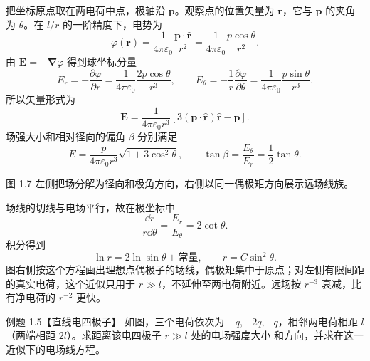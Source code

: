 \begin{xesolution}
把坐标原点取在两电荷中点，极轴沿 $\boldsymbol p$。观察点的位置矢量为 $\boldsymbol r$，它与
$\boldsymbol p$ 的夹角为 $\theta$。在 $l/r$ 的一阶精度下，电势为
\[
  \varphi(\boldsymbol r)
  =\frac{1}{4\pi\varepsilon_0}\frac{\boldsymbol p\cdot\hat{\boldsymbol r}}{r^2}
  =\frac{1}{4\pi\varepsilon_0}\frac{p\cos\theta}{r^2}.
\]
由 $\boldsymbol E=-\boldsymbol\nabla\varphi$ 得到球坐标分量
\[
  E_r=-\frac{\partial\varphi}{\partial r}
  =\frac{1}{4\pi\varepsilon_0}\frac{2p\cos\theta}{r^3},
  \qquad
  E_\theta=-\frac1r\frac{\partial\varphi}{\partial\theta}
  =\frac{1}{4\pi\varepsilon_0}\frac{p\sin\theta}{r^3}.
\]
所以矢量形式为
\[
  \boxed{\boldsymbol E
  =\frac{1}{4\pi\varepsilon_0r^3}
  \left[3(\boldsymbol p\cdot\hat{\boldsymbol r})\hat{\boldsymbol r}-\boldsymbol p\right]}.
\]
场强大小和相对径向的偏角 $\beta$ 分别满足
\[
  \boxed{E=\frac{p}{4\pi\varepsilon_0r^3}\sqrt{1+3\cos^2\theta}},
  \qquad
  \tan\beta=\frac{E_\theta}{E_r}=\frac12\tan\theta.
\]

图 1.7 左侧把场分解为径向和极角方向，右侧以同一偶极矩方向展示远场线族。

\dipoleFarFigure
{}

场线的切线与电场平行，故在极坐标中
\[
  \frac{\dd r}{r\dd\theta}=\frac{E_r}{E_\theta}=2\cot\theta.
\]
积分得到
\[
  \ln r=2\ln\sin\theta+\text{常量},
  \qquad
  \boxed{r=C\sin^2\theta}.
\]
图右侧按这个方程画出理想点偶极子的场线，偶极矩集中于原点；对左侧有限间距的真实电荷，这个近似只用于 $r\gg l$，不延伸至两电荷附近。远场按 $r^{-3}$ 衰减，比有净电荷的
$r^{-2}$ 更快。
\end{xesolution}

\begin{origexamplebox}{例题 1.5【直线电四极子】}
如图，三个电荷依次为 $-q,+2q,-q$，相邻两电荷相距 $l$（两端相距 $2l$）。求距离该电四极子 $r\gg l$ 处的电场强度大小
和方向，并求在这一近似下的电场线方程。
\emQuadrupoleQuestion
{}\label{fig:em-question-5}
\end{origexamplebox}

